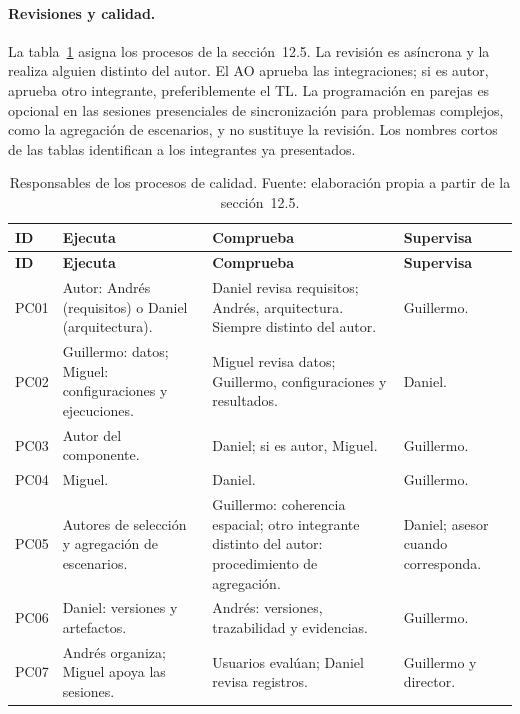 \paragraph{Revisiones y calidad.} La tabla~\ref{tab:resp-calidad} asigna los procesos de la sección~12.5. La revisión es asíncrona y la realiza alguien distinto del autor. El AO aprueba las integraciones; si es autor, aprueba otro integrante, preferiblemente el TL. La programación en parejas es opcional en las sesiones presenciales de sincronización para problemas complejos, como la agregación de escenarios, y no sustituye la revisión. Los nombres cortos de las tablas identifican a los integrantes ya presentados.

\begin{longtable}{|p{}|p{}|p{}|p{}|}
\caption{Responsables de los procesos de calidad. Fuente: elaboración propia a partir de la sección~12.5.}\label{tab:resp-calidad}\\\hline
\textbf{ID} & \textbf{Ejecuta} & \textbf{Comprueba} & \textbf{Supervisa}\tabularnewline\hline
\endfirsthead
\hline
\textbf{ID} & \textbf{Ejecuta} & \textbf{Comprueba} & \textbf{Supervisa}\tabularnewline\hline
\endhead
PC01 & \raggedright Autor: Andrés (requisitos) o Daniel (arquitectura). & \raggedright Daniel revisa requisitos; Andrés, arquitectura. Siempre distinto del autor. & \raggedright Guillermo.\tabularnewline\hline
PC02 & \raggedright Guillermo: datos; Miguel: configuraciones y ejecuciones. & \raggedright Miguel revisa datos; Guillermo, configuraciones y resultados. & \raggedright Daniel.\tabularnewline\hline
PC03 & \raggedright Autor del componente. & \raggedright Daniel; si es autor, Miguel. & \raggedright Guillermo.\tabularnewline\hline
PC04 & \raggedright Miguel. & \raggedright Daniel. & \raggedright Guillermo.\tabularnewline\hline
PC05 & \raggedright Autores de selección y agregación de escenarios. & \raggedright Guillermo: coherencia espacial; otro integrante distinto del autor: procedimiento de agregación. & \raggedright Daniel; asesor cuando corresponda.\tabularnewline\hline
PC06 & \raggedright Daniel: versiones y artefactos. & \raggedright Andrés: versiones, trazabilidad y evidencias. & \raggedright Guillermo.\tabularnewline\hline
PC07 & \raggedright Andrés organiza; Miguel apoya las sesiones. & \raggedright Usuarios evalúan; Daniel revisa registros. & \raggedright Guillermo y director.\tabularnewline\hline
\end{longtable}

